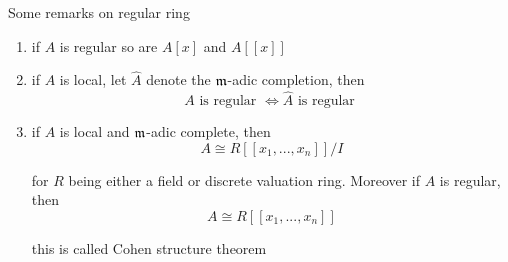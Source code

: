 \begin{remark}
	Some remarks on regular ring
	\begin{enumerate}
		\item if $A$ is regular so are $A[x]$ and $A[[x]]$
		\item if $A$ is local, let $\hat{A}$ denote the $\mathfrak{m}$-adic completion, then 
		$$
			A \text{ is regular } \iff \hat{A} \text{ is regular }
		$$
		
		\item if $A$ is local and $\mathfrak{m}$-adic complete, then 
		$$
			A \cong R[[x_1, ..., x_n]] / I
		$$
		
		for $R$ being either a field or discrete valuation ring. Moreover if $A$ is regular, then
		$$
			A \cong R[[x_1, ..., x_n]]
		$$
		
		this is called Cohen structure theorem
	\end{enumerate}
\end{remark}